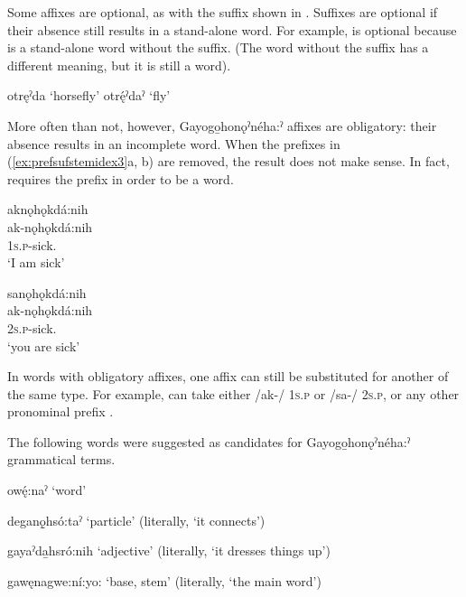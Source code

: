 Some affixes are optional, as with the  suffix shown in . Suffixes are optional if their absence still results in a stand-alone word. For example,  is optional because   is a stand-alone word without the suffix. (The word without the suffix has a different meaning, but it is still a word).

\ea\label{ex:prefsufstemidex2}
\ea otręˀda ‘horsefly’\label{ex:prefsufstemidex2a}
\ex otrę́ˀdaˀ ‘fly’\label{ex:prefsufstemidex2b}
\z
\z

More often than not, however, Gayogo̱honǫˀnéha:ˀ affixes are obligatory: their absence results in an incomplete word. When the prefixes in (\ref{ex:prefsufstemidex3}a, b) are removed, the result  does not make sense. In fact,  requires the prefix in order to be a word.

\ea\label{ex:prefsufstemidex3}
\ea aknǫhǫkdá:nih\\\label{ex:prefsufstemidex3a}
\gll ak-nǫhǫkdá:nih\\
 \textsc{1s.p}-sick.{\stative}\\
\glt `I am sick'

\ex sanǫhǫkdá:nih\\\label{ex:prefsufstemidex3b}
\gll ak-nǫhǫkdá:nih\\
 \textsc{2s.p}-sick.{\stative}\\
\glt `you are sick'

\z
\z

In words with obligatory affixes, one affix can still be substituted for another of the same type. For example,  can take either /ak-/ \textsc{1s.p} or /sa-/ \textsc{2s.p}, or any other pronominal prefix .

The following words were suggested as candidates for Gayogo̱honǫˀnéha:ˀ grammatical terms.

\ea\label{ex:cayugaprefsufstemidex3}
\ea owę́:naˀ	‘word’\label{ex:cayugaprefsufstemidex3a}

\ex deganǫ̱hsó:taˀ	‘particle’ (literally, ‘it connects’)\label{ex:cayugaprefsufstemidex3b}

\ex gayaˀda̱hsró:nih	‘adjective’ (literally, ‘it dresses things up’)\label{ex:cayugaprefsufstemidex3c}

\ex gawęnagwe:ní:yo: ‘base, stem’ (literally, ‘the main word’)\label{ex:cayugaprefsufstemidex3d}

